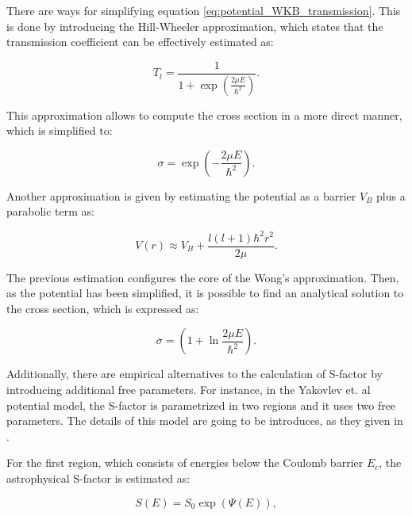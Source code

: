 \documentclass[openany]{book}
\begin{document}
There are ways for simplifying equation   \ref{eq:potential_WKB_transmission}. This is done by introducing the Hill-Wheeler approximation, which states that the transmission coefficient can be effectively estimated as: 

\begin{equation} \label{eq:potential_WKB_transmission_HW}
	T_l =  \frac{1}{1 + \exp {\left ( \frac {2\mu E} {\hbar^2} \right)} }.
\end{equation}

This approximation allows to compute the cross section in a more direct manner, which is simplified to: 

\begin{equation} \label{eq:potential_WKB_crossSection_HW}
	\sigma = \exp{\left( - \frac{2\mu E}{\hbar^2}\right)}.
\end{equation}

Another approximation is given by estimating the potential as a barrier $V_B$ plus a parabolic term as:

\begin{equation} \label{eq:potential_WKB_potential_Wong}
	V(r) \approx V_B + \frac{l(l+1) \hbar^2  r^2 }{2\mu}.
\end{equation}

The previous estimation configures the core of the Wong's approximation. Then, as the potential has been simplified, it is possible to find an analytical solution to the cross section, which is expressed as: 

\begin{equation} \label{eq:potential_WKB_crossSection_Wong}
	\sigma = \left( 1 + \ln{\frac{2\mu E}{\hbar ^2}} \right).
\end{equation}

Additionally, there are empirical alternatives to the calculation of S-factor by introducing additional free parameters. For instance, in the Yakovlev et. al potential model, the S-factor is parametrized in two regions and it uses two free parameters.  The details of this model are going to be introduces, as they given in \cite{yakovlev_beard_gasques_wiescher_2010}. 

For the first region, which consists of energies below the Coulomb barrier $E_c$, the astrophysical S-factor is estimated as:

\begin{equation}  \label{eq:potential_Yakovlev_sfactor_belowBarrier}
	S(E) = S_0 \exp ({\Psi(E)} ),
\end{equation}
\end{document}
